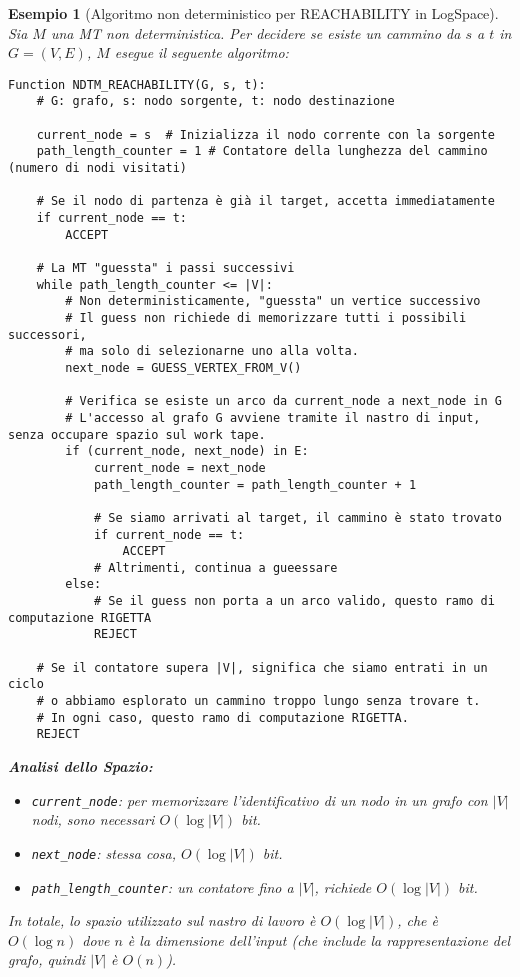 \documentclass[a4paper, 11pt]{book} %
\newtheorem{example}[theorem]{Esempio}
\theoremstyle{definition}
\begin{document}
\begin{example}[Algoritmo non deterministico per REACHABILITY in LogSpace]
Sia $M$ una MT non deterministica. Per decidere se esiste un cammino da $s$ a $t$ in $G=(V,E)$, $M$ esegue il seguente algoritmo:

\begin{verbatim}
Function NDTM_REACHABILITY(G, s, t):
    # G: grafo, s: nodo sorgente, t: nodo destinazione
    
    current_node = s  # Inizializza il nodo corrente con la sorgente
    path_length_counter = 1 # Contatore della lunghezza del cammino (numero di nodi visitati)
    
    # Se il nodo di partenza è già il target, accetta immediatamente
    if current_node == t:
        ACCEPT
        
    # La MT "guessta" i passi successivi
    while path_length_counter <= |V|:
        # Non deterministicamente, "guessta" un vertice successivo
        # Il guess non richiede di memorizzare tutti i possibili successori,
        # ma solo di selezionarne uno alla volta.
        next_node = GUESS_VERTEX_FROM_V() 
        
        # Verifica se esiste un arco da current_node a next_node in G
        # L'accesso al grafo G avviene tramite il nastro di input, senza occupare spazio sul work tape.
        if (current_node, next_node) in E:
            current_node = next_node
            path_length_counter = path_length_counter + 1
            
            # Se siamo arrivati al target, il cammino è stato trovato
            if current_node == t:
                ACCEPT
            # Altrimenti, continua a gueessare
        else:
            # Se il guess non porta a un arco valido, questo ramo di computazione RIGETTA
            REJECT
    
    # Se il contatore supera |V|, significa che siamo entrati in un ciclo
    # o abbiamo esplorato un cammino troppo lungo senza trovare t.
    # In ogni caso, questo ramo di computazione RIGETTA.
    REJECT
\end{verbatim}

\textbf{Analisi dello Spazio:}
\begin{itemize}
    \item \texttt{current\_node}: per memorizzare l'identificativo di un nodo in un grafo con $|V|$ nodi, sono necessari $O(\log |V|)$ bit.
    \item \texttt{next\_node}: stessa cosa, $O(\log |V|)$ bit.
    \item \texttt{path\_length\_counter}: un contatore fino a $|V|$, richiede $O(\log |V|)$ bit.
\end{itemize}
In totale, lo spazio utilizzato sul nastro di lavoro è $O(\log |V|)$, che è $O(\log n)$ dove $n$ è la dimensione dell'input (che include la rappresentazione del grafo, quindi $|V|$ è $O(n)$).


\end{example}
\end{document}
